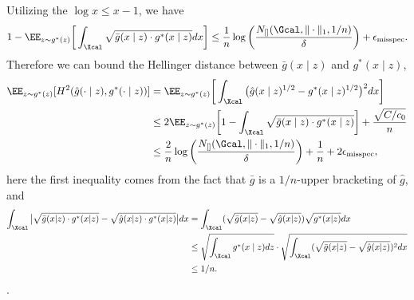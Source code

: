\documentclass[12pt]{extarticle} %
\newcommand{\misp}{\epsilon_{\text{misspec}}}
\begin{document}
 Utilizing the $\log x \leq x-1$, we have $$
1- \EE_{z\sim g^*(z)}\bigg[\int_{\Xcal} \sqrt{\bar{g}(x\mid z)\cdot g^*(x\mid z)}dx\bigg] \leq \frac{1}{n} \log\bigg(\frac{N_{[]}(\Gcal,\|\cdot\|_1,1/n)}{\delta}\bigg)+{\misp}.
$$
Therefore we can bound the Hellinger distance between $\bar{g}(x\mid z)$ and $g^*(x\mid z)$,
\begin{align}\label{hell-dist-1}
    \EE_{z\sim g^*(z)}[H^2(\hat{g}(\cdot\mid z), g^*(\cdot \mid z))] &= \EE_{z\sim g^*(z)}\bigg[\int_{\Xcal}\big(\hat{g}(x\mid z)^{1/2} - g^*(x\mid z)^{1/2} \big)^2dx\bigg]\nonumber\\
    &\leq 2\EE_{z\sim g^*(z)}\bigg[1-\int_{\Xcal}\sqrt{\bar{g}(x\mid z)\cdot g^*(x\mid z)}\bigg] + \frac{\sqrt{C/c_0}}{n}\nonumber\\
    &\leq \frac{2}{n}\log\bigg(\frac{N_{[]}(\Gcal,\|\cdot\|_1,1/n)}{\delta}\bigg)+\frac{1}{n}+{2\misp},
\end{align}
here the first inequality comes from the fact that $\bar{g}$ is a $1/n$-upper bracketing of $\hat{g}$, and \begin{align*}
    \int_\Xcal \big|\sqrt{\bar{g}(x|z)\cdot g^*(x|z)} - \sqrt{\hat{g}(x|z)\cdot g^*(x|z)} \big|dx &= \int_{\Xcal} (\sqrt{\bar{g}(x|z)} - \sqrt{\hat{g}(x|z)})\sqrt{g^*(x|z)}dx\\
    &\leq \sqrt{\int_\Xcal g^*(x\mid z)dz}\cdot \sqrt{\int_\Xcal (\sqrt{\bar{g}(x|z)} - \sqrt{\hat{g}(x|z)})^2 dx}\\
    &\leq 1/n.
\end{align*}. 
\end{document}
